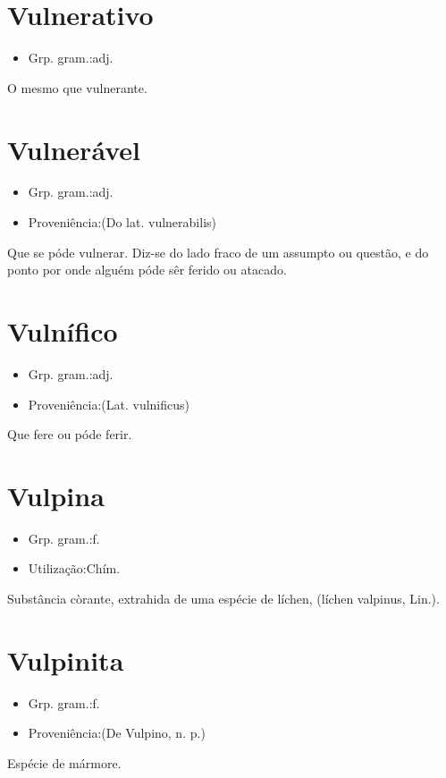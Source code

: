 \documentclass{article}
\begin{document}
\section{Vulnerativo}
\begin{itemize}
\item {Grp. gram.:adj.}
\end{itemize}
O mesmo que \textunderscore vulnerante\textunderscore .
\section{Vulnerável}
\begin{itemize}
\item {Grp. gram.:adj.}
\end{itemize}
\begin{itemize}
\item {Proveniência:(Do lat. \textunderscore vulnerabilis\textunderscore )}
\end{itemize}
Que se póde vulnerar.
Diz-se do lado fraco de um assumpto ou questão, e do ponto por onde alguém póde sêr ferido ou atacado.
\section{Vulnífico}
\begin{itemize}
\item {Grp. gram.:adj.}
\end{itemize}
\begin{itemize}
\item {Proveniência:(Lat. \textunderscore vulnificus\textunderscore )}
\end{itemize}
Que fere ou póde ferir.
\section{Vulpina}
\begin{itemize}
\item {Grp. gram.:f.}
\end{itemize}
\begin{itemize}
\item {Utilização:Chím.}
\end{itemize}
Substância còrante, extrahida de uma espécie de líchen, (\textunderscore líchen valpinus\textunderscore , Lin.).
\section{Vulpinita}
\begin{itemize}
\item {Grp. gram.:f.}
\end{itemize}
\begin{itemize}
\item {Proveniência:(De \textunderscore Vulpino\textunderscore , n. p.)}
\end{itemize}
Espécie de mármore.
\end{document}
